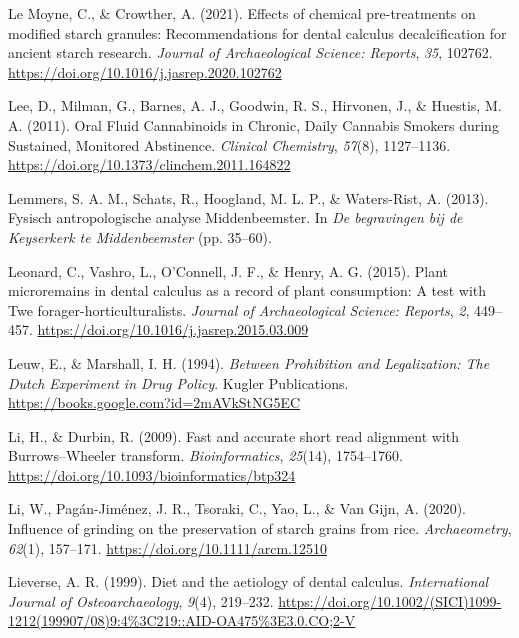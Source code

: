 \documentclass[
  letterpaper,
]{book}
\newlength{\cslhangindent}
\newlength{\cslentryspacingunit} %
\newenvironment{CSLReferences}[2] %
 {%
  \setlength{\parindent}{0pt}
  \ifodd #1
  \let\oldpar\par
  \def\par{\hangindent=\cslhangindent\oldpar}
  \fi
  \setlength{\parskip}{#2\cslentryspacingunit}
 }%
 {}
\begin{document}
\begin{CSLReferences}{1}{0}
\leavevmode{}%
Le Moyne, C., \& Crowther, A. (2021). Effects of chemical pre-treatments
on modified starch granules: {Recommendations} for dental calculus
decalcification for ancient starch research. \emph{Journal of
Archaeological Science: Reports}, \emph{35}, 102762.
\url{https://doi.org/10.1016/j.jasrep.2020.102762}

\leavevmode{}%
Lee, D., Milman, G., Barnes, A. J., Goodwin, R. S., Hirvonen, J., \&
Huestis, M. A. (2011). Oral {Fluid Cannabinoids} in {Chronic}, {Daily
Cannabis Smokers} during {Sustained}, {Monitored Abstinence}.
\emph{Clinical Chemistry}, \emph{57}(8), 1127--1136.
\url{https://doi.org/10.1373/clinchem.2011.164822}

\leavevmode{}%
Lemmers, S. A. M., Schats, R., Hoogland, M. L. P., \& Waters-Rist, A.
(2013). Fysisch antropologische analyse Middenbeemster. In \emph{De
begravingen bij de Keyserkerk te Middenbeemster} (pp. 35--60).

\leavevmode{}%
Leonard, C., Vashro, L., O'Connell, J. F., \& Henry, A. G. (2015). Plant
microremains in dental calculus as a record of plant consumption: {A}
test with {Twe} forager-horticulturalists. \emph{Journal of
Archaeological Science: Reports}, \emph{2}, 449--457.
\url{https://doi.org/10.1016/j.jasrep.2015.03.009}

\leavevmode{}%
Leuw, E., \& Marshall, I. H. (1994). \emph{Between {Prohibition} and
{Legalization}: {The Dutch Experiment} in {Drug Policy}}. {Kugler
Publications}. \url{https://books.google.com?id=2mAVkStNG5EC}

\leavevmode{}%
Li, H., \& Durbin, R. (2009). Fast and accurate short read alignment
with {Burrows}--{Wheeler} transform. \emph{Bioinformatics},
\emph{25}(14), 1754--1760.
\url{https://doi.org/10.1093/bioinformatics/btp324}

\leavevmode{}%
Li, W., Pagán-Jiménez, J. R., Tsoraki, C., Yao, L., \& Van Gijn, A.
(2020). Influence of grinding on the preservation of starch grains from
rice. \emph{Archaeometry}, \emph{62}(1), 157--171.
\url{https://doi.org/10.1111/arcm.12510}

\leavevmode{}%
Lieverse, A. R. (1999). Diet and the aetiology of dental calculus.
\emph{International Journal of Osteoarchaeology}, \emph{9}(4), 219--232.
\url{https://doi.org/10.1002/(SICI)1099-1212(199907/08)9:4\%3C219::AID-OA475\%3E3.0.CO;2-V}


\end{CSLReferences}
\end{document}
